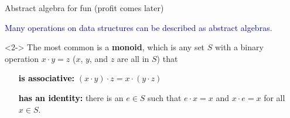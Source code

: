 \documentclass[aspectratio=169]{beamer}
\begin{document}
\begin{frame}{Abstract algebra for fun (profit comes later)}
\vspace{0.5 cm}
\large

\textcolor{darkblue}{Many operations on data structures can be described as abstract algebras.}

\vspace{0.5 cm}
\begin{uncoverenv}<2->
The most common is a {\bf monoid}, which is any set $S$ with a binary operation $x \cdot y = z$ ($x$, $y$, and $z$ are all in $S$) that

\begin{center}
\begin{minipage}{0.5\linewidth}
\begin{itemize}
\item[\textcolor{black}{\bf is associative:}] $(x \cdot y) \cdot z = x \cdot (y \cdot z)$

\item[\textcolor{black}{\bf has an identity:}] there is an $e \in S$ such that $e \cdot x = x$ and $x \cdot e = x$ for all $x \in S$.
\end{itemize}
\end{minipage}
\end{center}
\end{uncoverenv}

\vspace{0.5 cm}
\end{frame}
\end{document}

